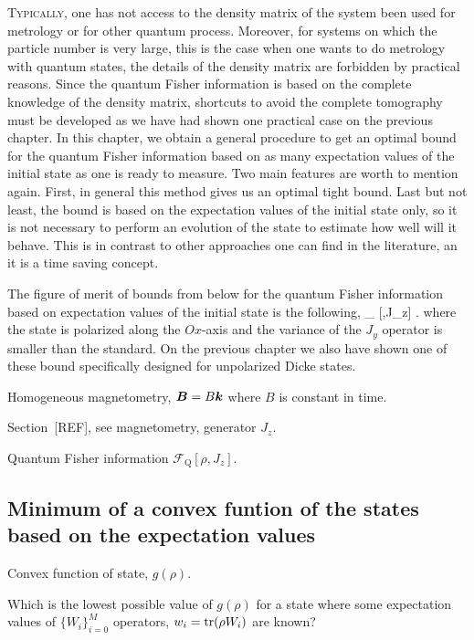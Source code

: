 \lettrine[lines=2, findent=3pt,nindent=0pt]{T}{ypically}, one has not access to the density matrix of the system been used for metrology or for other quantum process.
Moreover, for systems on which the particle number is very large, this is the case when one wants to do metrology with quantum states, the details of the density matrix are forbidden by practical reasons.
Since the quantum Fisher information is based on the complete knowledge of the density matrix, shortcuts to avoid the complete tomography must be developed as we have had shown one practical case on the previous chapter.
In this chapter, we obtain a general procedure to get an optimal bound for the quantum Fisher information based on as many expectation values of the initial state as one is ready to measure.
Two main features are worth to mention again.
First, in general this method gives us an optimal tight bound.
Last but not least, the bound is based on the expectation values of the initial state only, so it is not necessary to perform an evolution of the state to estimate how well will it behave.
This is in contrast to other approaches one can find in the literature, an it is a time saving concept.

The figure of merit of bounds from below for the quantum Fisher information based on expectation values of the initial state is the following,
\be
  _{} [\rho,J_z] \geq {}.
\ee
where the state is polarized along the $Ox$-axis and the variance of the $J_y$ operator is smaller than the standard.
On the previous chapter we also have shown one of these bound specifically designed for unpolarized Dicke states.

Homogeneous magnetometry, $\boldsymbol{B} = B\boldsymbol{k}$ where $B$ is constant in time.

Section~[REF], see magnetometry, generator $J_z$.

Quantum Fisher information $\mathcal{F}_{\text{Q}} [\rho, J_z]$.

\subsection{Minimum of a convex funtion of the states based on the expectation values}

Convex function of state, $g(\rho)$.

Which is the lowest possible value of $g(\rho)$ for a state where some expectation values of $\{W_{i}\}_{i=0}^M$ operators, $w_i = \operatorname{tr}(\rho {W}_i)$ are known?

